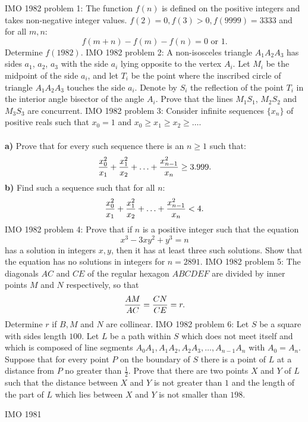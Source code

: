 IMO 1982 problem 1:  The function $f(n)$ is defined on the positive integers and takes non-negative integer values. $f(2)=0,f(3)>0,f(9999)=3333$ and for all $m,n:$
\[ f(m+n)-f(m)-f(n)=0 \text{ or } 1. \]
Determine $f(1982)$. 
IMO 1982 problem 2:  A non-isosceles triangle $A_1A_2A_3$ has sides $a_1$, $a_2$, $a_3$ with the side $a_i$ lying opposite to the vertex $A_i$. Let $M_i$ be the midpoint of the side $a_i$, and let $T_i$ be the point where the inscribed circle of triangle $A_1A_2A_3$ touches the side $a_i$. Denote by $S_i$ the reflection of the point $T_i$ in the interior angle bisector of the angle $A_i$. Prove that the lines $M_1S_1$, $M_2S_2$ and $M_3S_3$ are concurrent. 
IMO 1982 problem 3:  Consider infinite sequences $\{x_n\}$ of positive reals such that $x_0=1$ and $x_0\ge x_1\ge x_2\ge\ldots$. \\\\
\textbf{a)} Prove that for every such sequence there is an $n\ge1$ such that:
\[ {x_0^2\over x_1}+{x_1^2\over x_2}+\ldots+{x_{n-1}^2\over x_n}\ge3.999. \]
\textbf{b)} Find such a sequence such that for all $n$:
\[ {x_0^2\over x_1}+{x_1^2\over x_2}+\ldots+{x_{n-1}^2\over x_n}<4. \] 
IMO 1982 problem 4:  Prove that if $n$ is a positive integer such that the equation
\[ x^3-3xy^2+y^3=n \]
has a solution in integers $x,y$, then it has at least three such solutions. Show that the equation has no solutions in integers for $n=2891$. 
IMO 1982 problem 5:  The diagonals $AC$ and $CE$ of the regular hexagon $ABCDEF$ are divided by inner points $M$ and $N$ respectively, so that
\[ {AM\over AC}={CN\over CE}=r. \]
Determine $r$ if $B,M$ and $N$ are collinear. 
IMO 1982 problem 6:  Let $S$ be a square with sides length $100$. Let $L$ be a path within $S$ which does not meet itself and which is composed of line segments $A_0A_1,A_1A_2,A_2A_3,\ldots,A_{n-1}A_n$ with $A_0=A_n$. Suppose that for every point $P$ on the boundary of $S$ there is a point of $L$ at a distance from $P$ no greater than $\frac {1} {2}$. Prove that there are two points $X$ and $Y$ of $L$ such that the distance between $X$ and $Y$ is not greater than $1$ and the length of the part of $L$ which lies between $X$ and $Y$ is not smaller than $198$. 

IMO 1981 

